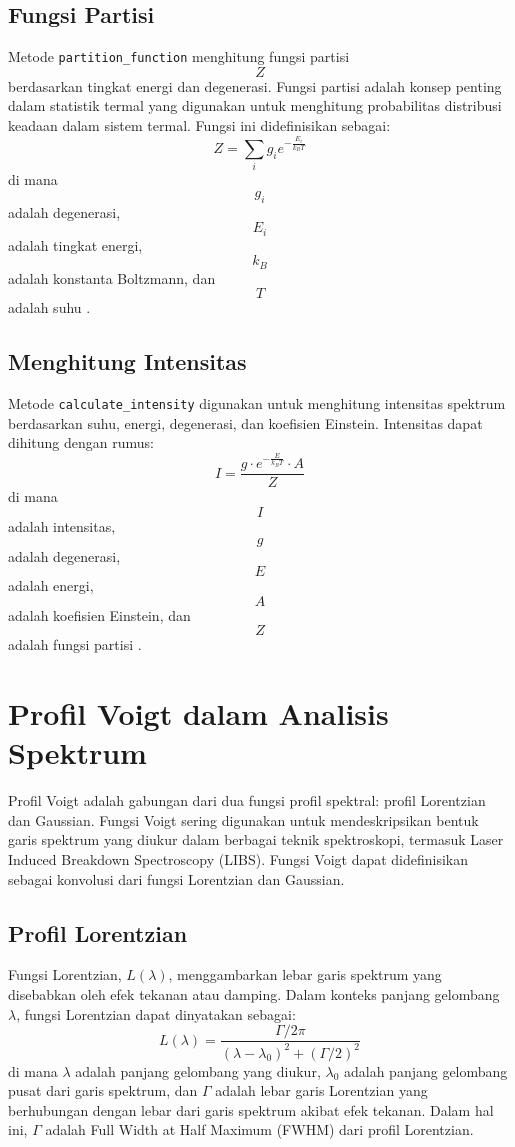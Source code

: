 \subsection{Fungsi Partisi}
\par Metode \texttt{partition\_function} menghitung fungsi partisi $$Z$$ berdasarkan tingkat energi dan degenerasi. Fungsi partisi adalah konsep penting dalam statistik termal yang digunakan untuk menghitung probabilitas distribusi keadaan dalam sistem termal. Fungsi ini didefinisikan sebagai:
$$
Z = \sum_{i} g_i e^{-\frac{E_i}{k_B T}}
$$
di mana $$g_i$$ adalah degenerasi, $$E_i$$ adalah tingkat energi, $$k_B$$ adalah konstanta Boltzmann, dan $$T$$ adalah suhu \citep{pathria2011}.

\subsection{Menghitung Intensitas}
\par Metode \texttt{calculate\_intensity} digunakan untuk menghitung intensitas spektrum berdasarkan suhu, energi, degenerasi, dan koefisien Einstein. Intensitas dapat dihitung dengan rumus:
$$
I = \frac{g \cdot e^{-\frac{E}{k_B T}} \cdot A}{Z}
$$
di mana $$I$$ adalah intensitas, $$g$$ adalah degenerasi, $$E$$ adalah energi, $$A$$ adalah koefisien Einstein, dan $$Z$$ adalah fungsi partisi \citep{mason2015}.


\section{Profil Voigt dalam Analisis Spektrum}
\par Profil Voigt adalah gabungan dari dua fungsi profil spektral: profil Lorentzian dan Gaussian. Fungsi Voigt sering digunakan untuk mendeskripsikan bentuk garis spektrum yang diukur dalam berbagai teknik spektroskopi, termasuk Laser Induced Breakdown Spectroscopy (LIBS). Fungsi Voigt dapat didefinisikan sebagai konvolusi dari fungsi Lorentzian dan Gaussian.

\subsection{Profil Lorentzian}
\par Fungsi Lorentzian, \( L(\lambda) \), menggambarkan lebar garis spektrum yang disebabkan oleh efek tekanan atau damping. Dalam konteks panjang gelombang \( \lambda \), fungsi Lorentzian dapat dinyatakan sebagai:
\begin{equation}
L(\lambda) = \frac{\Gamma / 2\pi}{(\lambda - \lambda_0)^2 + (\Gamma / 2)^2}
\end{equation}
di mana \( \lambda \) adalah panjang gelombang yang diukur, \( \lambda_0 \) adalah panjang gelombang pusat dari garis spektrum, dan \( \Gamma \) adalah lebar garis Lorentzian yang berhubungan dengan lebar dari garis spektrum akibat efek tekanan. Dalam hal ini, \( \Gamma \) adalah Full Width at Half Maximum (FWHM) dari profil Lorentzian.

